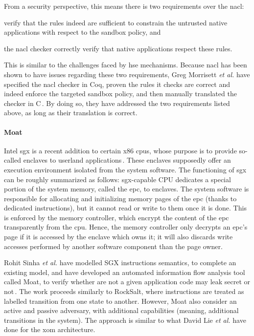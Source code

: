 From a security perspective, this means there is two requirements over the
\ac{nacl}:
%
\begin{inparaenum}[(1)]
\item verify that the rules indeed are sufficient to constrain the untrusted
  native applications with respect to the sandbox policy, and
%
\item the \ac{nacl} checker correctly verify that native applications respect
  these rules.
\end{inparaenum}
%
This is similar to the challenges faced by \ac{hse} mechanisms.
%
Because \ac{nacl} has been shown to have issues regarding these two
requirements, Greg Morrisett \emph{et al.} have specified the \ac{nacl} checker
in Coq, proven the rules it checks are correct and indeed enforce the targeted
sandbox policy, and then manually translated the checker in
C\,\cite{morrisett2012rocksalt}.
%
By doing so, they have addressed the two requirements listed above, as long as
their translation is correct.

\paragraph{Moat}
%
Intel \ac{sgx} is a recent addition to certain x86 \acp{cpu}, whose purpose is
to provide so-called enclaves to userland
applications\,\cite{costan2016sgxexplained}.
%
These enclaves supposedly offer an execution environment isolated from the
system software.
%
The functioning of \ac{sgx} can be roughly summarized as follows:
\ac{sgx}-capable CPU dedicates a special portion of the system memory, called
the \ac{epc}, to enclaves.
%
The system software is responsible for allocating and initializing memory pages
of the \ac{epc} (thanks to dedicated instructions), but it cannot read or write
to them once it is done.
%
This is enforced by the memory controller, which encrypt the content of the
\ac{epc} transparently from the \ac{cpu}.
%
Hence, the memory controller only decrypts an \ac{epc}'s page if it is accessed
by the enclave which owns it; it will also discards write accesses performed by
another software component than the page owner.

Rohit Sinha \emph{et al.} have modelled SGX instructions semantics, to complete
an existing model, and have developed an automated information flow analysis
tool called Moat, to verify whether are not a given application code may leak
secret or not\,\cite{sinha2015moat}.
%
The work proceeds similarly to RockSalt, where instructions are treated as
labelled transition from one state to another.
%
However, Moat also consider an active and passive adversary, with additional
capabilities (meaning, additional transitions in the system).
%
The approach is similar to what David Lie \emph{et al.} have done for the
\ac{xom} architecture.


